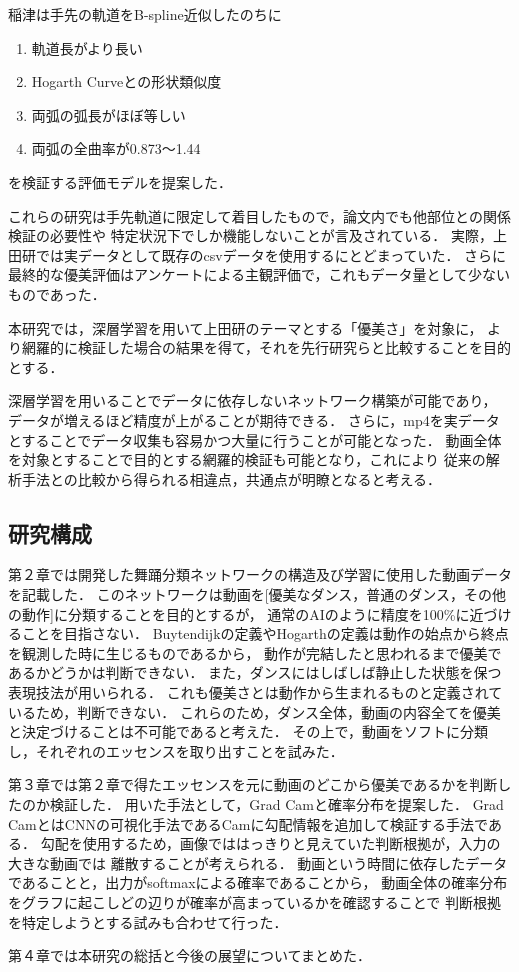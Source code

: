 \clearpage

稲津は手先の軌道をB-spline近似したのちに
\begin{enumerate}
  \item 軌道長がより長い
  \item Hogarth Curveとの形状類似度
  \item 両弧の弧長がほぼ等しい
  \item 両弧の全曲率が0.873〜1.44
\end{enumerate}
を検証する評価モデルを提案した．

これらの研究は手先軌道に限定して着目したもので，論文内でも他部位との関係検証の必要性や
特定状況下でしか機能しないことが言及されている．
実際，上田研では実データとして既存のcsvデータを使用するにとどまっていた．
さらに最終的な優美評価はアンケートによる主観評価で，これもデータ量として少ないものであった．

本研究では，深層学習を用いて上田研のテーマとする「優美さ」を対象に，
より網羅的に検証した場合の結果を得て，それを先行研究らと比較することを目的とする．

深層学習を用いることでデータに依存しないネットワーク構築が可能であり，
データが増えるほど精度が上がることが期待できる．
さらに，mp4を実データとすることでデータ収集も容易かつ大量に行うことが可能となった．
動画全体を対象とすることで目的とする網羅的検証も可能となり，これにより
従来の解析手法との比較から得られる相違点，共通点が明瞭となると考える．

\subsection{研究構成}
第２章では開発した舞踊分類ネットワークの構造及び学習に使用した動画データを記載した．
このネットワークは動画を[優美なダンス，普通のダンス，その他の動作]に分類することを目的とするが，
通常のAIのように精度を100\%に近づけることを目指さない．
Buytendijkの定義やHogarthの定義は動作の始点から終点を観測した時に生じるものであるから，
動作が完結したと思われるまで優美であるかどうかは判断できない．
また，ダンスにはしばしば静止した状態を保つ表現技法が用いられる．
これも優美さとは動作から生まれるものと定義されているため，判断できない．
これらのため，ダンス全体，動画の内容全てを優美と決定づけることは不可能であると考えた．
その上で，動画をソフトに分類し，それぞれのエッセンスを取り出すことを試みた．

第３章では第２章で得たエッセンスを元に動画のどこから優美であるかを判断したのか検証した．
用いた手法として，Grad Cam\cite{gradcam}と確率分布を提案した．
Grad CamとはCNNの可視化手法であるCam\cite{cam}に勾配情報を追加して検証する手法である．
勾配を使用するため，画像でははっきりと見えていた判断根拠が，入力の大きな動画では
離散することが考えられる．
動画という時間に依存したデータであることと，出力がsoftmaxによる確率であることから，
動画全体の確率分布をグラフに起こしどの辺りが確率が高まっているかを確認することで
判断根拠を特定しようとする試みも合わせて行った．

第４章では本研究の総括と今後の展望についてまとめた．